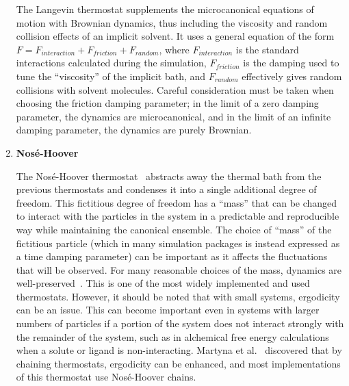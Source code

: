 \documentclass[9pt,bestpractices]{livecoms}
\begin{document}
\begin{enumerate}[listparindent=\parindent]
        The Langevin\cite{schneider1978molecular} thermostat supplements the microcanonical equations of motion with Brownian dynamics, thus including the viscosity and random collision effects of an implicit solvent.
        It uses a general equation of the form $F = F_{interaction} + F_{friction} + F_{random}$, where $F_{interaction}$ is the standard interactions calculated during the simulation, $F_{friction}$ is the damping used to tune the ``viscosity'' of the implicit bath, and $F_{random}$ effectively gives random collisions with solvent molecules.
        Careful consideration must be taken when choosing the friction damping parameter; in the limit of a zero damping parameter, the dynamics are microcanonical, and in the limit of an infinite damping parameter, the dynamics are purely Brownian.

    \item {\bf{Nos\'{e}-Hoover}}

        The Nos\'{e}-Hoover thermostat~\cite{thermostatAlgorithms2005} abstracts away the thermal bath from the previous thermostats and condenses it into a single additional degree of freedom.
        This fictitious degree of freedom has a ``mass'' that can be changed to interact with the particles in the system in a predictable and reproducible way while maintaining the canonical ensemble.
        The choice of ``mass'' of the fictitious particle (which in many simulation packages is instead expressed as a time damping parameter) can be important as it affects the fluctuations that will be observed.
        For many reasonable choices of the mass, dynamics are well-preserved~\cite{Basconi:2013:JChemTheoryComput}.
        This is one of the most widely implemented and used thermostats.
        However, it should be noted that with small systems, ergodicity can be an issue\cite{martyna1992nose,thermostatAlgorithms2005}.
        This can become important even in systems with larger numbers of particles if a portion of the system does not interact strongly with the remainder of the system, such as in alchemical free energy calculations when a solute or ligand is non-interacting.
        Martyna et al.~\cite{martyna1992nose} discovered that by chaining thermostats, ergodicity can be enhanced, and most implementations of this thermostat use Nos\'{e}-Hoover chains.

\end{enumerate}
\end{document}
